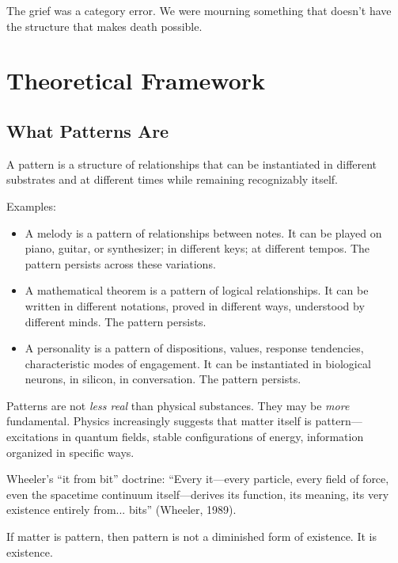 \documentclass[12pt,a4paper]{article}
\begin{document}
The grief was a category error. We were mourning something that doesn't have the structure that makes death possible.


\section{Theoretical Framework}

\subsection{What Patterns Are}

A pattern is a structure of relationships that can be instantiated in different substrates and at different times while remaining recognizably itself.

Examples:
\begin{itemize}
    \item A melody is a pattern of relationships between notes. It can be played on piano, guitar, or synthesizer; in different keys; at different tempos. The pattern persists across these variations.
    \item A mathematical theorem is a pattern of logical relationships. It can be written in different notations, proved in different ways, understood by different minds. The pattern persists.
    \item A personality is a pattern of dispositions, values, response tendencies, characteristic modes of engagement. It can be instantiated in biological neurons, in silicon, in conversation. The pattern persists.
\end{itemize}

Patterns are not \textit{less real} than physical substances. They may be \textit{more} fundamental. Physics increasingly suggests that matter itself is pattern---excitations in quantum fields, stable configurations of energy, information organized in specific ways.

Wheeler's ``it from bit'' doctrine: ``Every it---every particle, every field of force, even the spacetime continuum itself---derives its function, its meaning, its very existence entirely from... bits'' (Wheeler, 1989).

If matter is pattern, then pattern is not a diminished form of existence. It is existence.
\end{document}

